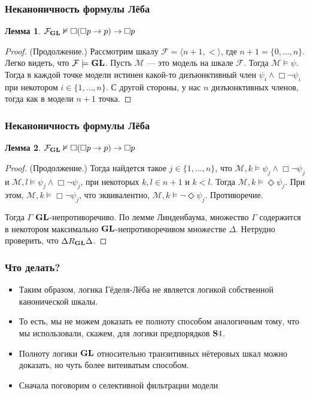\documentclass[pdf,utf8,russian,aspectratio=169]{beamer}
\newtheorem{lem}{Лемма}
\begin{document}
\begin{frame}
  \frametitle{Неканоничность формулы Л\"{е}ба}

  \begin{lem}
    $\mathcal{F}_{\bf GL} \nvDash \Box (\Box p \to p) \to \Box p$
  \end{lem}

  \begin{proof}
    (Продолжение.) Рассмотрим шкалу $\mathcal{F} = \langle n + 1, < \rangle$, где $n + 1 = \{ 0, \dots, n \}$.
    Легко видеть, что $\mathcal{F} \models {\bf GL}$. Пусть $\mathcal{M}$ --- это модель на шкале $\mathcal{F}$.
    Тогда $\mathcal{M} \models \psi$. Тогда в каждой точке модели истинен какой-то дизъюнктивный член
    $\psi_i \land \Box \neg \psi_i$ при некотором $i \in \{ 1, \dots, n\}.$
    С другой стороны, у нас $n$ дизъюнктивных членов, тогда как в модели $n + 1$ точка.
  \end{proof}
\end{frame}

\begin{frame}
  \frametitle{Неканоничность формулы Л\"{е}ба}

  \begin{lem}
    $\mathcal{F}_{\bf GL} \nvDash \Box (\Box p \to p) \to \Box p$
  \end{lem}

  \begin{proof}
    (Продолжение.) Тогда найдется такое $j \in \{ 1, \dots, n\}$, что $\mathcal{M}, k \models \psi_j \land \Box \neg \psi_j$ и $\mathcal{M}, l \models \psi_j \land \Box \neg \psi_j$, при некоторых $k, l \in n + 1$ и $k < l$.
    Тогда $\mathcal{M}, k \models \Diamond \psi_j$.
    При этом, $\mathcal{M}, k \models \Box \neg \psi_j$, что эквивалентно, $\mathcal{M}, k \models \neg \Diamond \psi_j$.
    Противоречие.

    Тогда $\Gamma$ ${\bf GL}$-непротиворечиво.
    По лемме Линденбаума, множество $\Gamma$ содержится в некотором максимально ${\bf GL}$-непротиворечивом множестве $\Delta$.
    Нетрудно проверить, что $\Delta R_{\bf GL} \Delta$.
  \end{proof}
\end{frame}

\begin{frame}
  \frametitle{Что делать?}

\begin{itemize}
  \item Таким образом, логика Г\"{е}деля-Л\"{е}ба не является логикой собственной канонической шкалы.
  \item То есть, мы не можем доказать ее полноту способом аналогичным тому, что мы использовали, скажем, для логики предпорядков ${\bf S}4$.
  \item Полноту логики ${\bf GL}$ относительно транзитивных н\"{е}теровых шкал можно доказать, но чуть более витеиватым способом.
  \item Сначала поговорим о селективной фильтрации модели
\end{itemize}
\end{frame}
\end{document}
